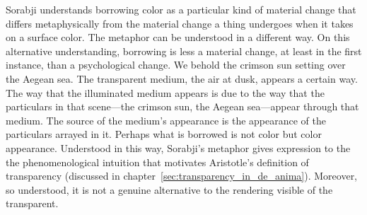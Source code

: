 Sorabji understands borrowing color as a particular kind of material change that differs metaphysically from the material change a thing undergoes when it takes on a surface color. The metaphor can be understood in a different way. On this alternative understanding, borrowing is less a material change, at least in the first instance, than a psychological change. We behold the crimson sun setting over the Aegean sea. The transparent medium, the air at dusk, appears a certain way. The way that the illuminated medium appears is due to the way that the particulars in that scene---the crimson sun, the Aegean sea---appear through that medium. The source of the medium's appearance is the appearance of the particulars arrayed in it. Perhaps what is borrowed is not color but color appearance. Understood in this way, Sorabji's metaphor gives expression to the the phenomenological intuition that motivates Aristotle's definition of transparency (discussed in chapter~\ref{sec:transparency_in_de_anima}). Moreover, so understood, it is not a genuine alternative to the rendering visible of the transparent.

